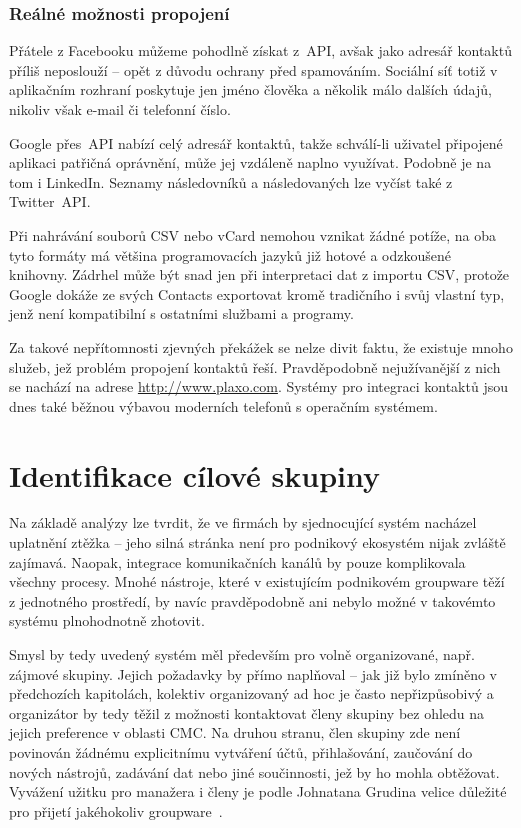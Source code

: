 \documentclass[12pt,oneside,final]{fithesis2}
\begin{document}
\subsubsection*{Reálné možnosti propojení}
Přátele z Facebooku můžeme pohodlně získat z~API, avšak jako adresář kontaktů příliš neposlouží -- opět z důvodu ochrany před spamováním. Sociální síť totiž v aplikačním rozhraní poskytuje jen jméno člověka a několik málo dalších údajů, nikoliv však e-mail či telefonní číslo.

Google přes~API nabízí celý adresář kontaktů, takže schválí-li uživatel připojené aplikaci patřičná oprávnění, může jej vzdáleně naplno využívat. Podobně je na tom i LinkedIn. Seznamy následovníků a následovaných lze vyčíst také z Twitter~API.

Při nahrávání souborů CSV nebo vCard nemohou vznikat žádné potíže, na oba tyto formáty má většina programovacích jazyků již hotové a odzkoušené knihovny. Zádrhel může být snad jen při interpretaci dat z importu CSV, protože Google dokáže ze svých Contacts exportovat kromě tradičního i svůj vlastní typ, jenž není kompatibilní s ostatními službami a programy.

Za takové nepřítomnosti zjevných překážek se nelze divit faktu, že existuje mnoho služeb, jež problém propojení kontaktů řeší. Pravděpodobně nejužívanější z nich se nachází na adrese \url{http://www.plaxo.com}. Systémy pro integraci kontaktů jsou dnes také běžnou výbavou moderních telefonů s operačním systémem.


\section{Identifikace cílové skupiny}\label{targetAudience}
Na základě analýzy lze tvrdit, že ve firmách by sjednocující systém nacházel uplatnění ztěžka -- jeho silná stránka není pro podnikový ekosystém nijak zvláště zajímavá. Naopak, integrace komunikačních kanálů by pouze komplikovala všechny procesy. Mnohé nástroje, které v existujícím podnikovém groupware těží z jednotného prostředí, by navíc pravděpodobně ani nebylo možné v takovémto systému plnohodnotně zhotovit.

Smysl by tedy uvedený systém měl především pro volně organizované, např. zájmové skupiny. Jejich požadavky by přímo naplňoval -- jak již bylo zmíněno v předchozích kapitolách, kolektiv organizovaný ad hoc je často nepřizpůsobivý a organizátor by tedy těžil z možnosti kontaktovat členy skupiny bez ohledu na jejich preference v oblasti CMC. Na druhou stranu, člen skupiny zde není povinován žádnému explicitnímu vytváření účtů, přihlašování, zaučování do nových nástrojů, zadávání dat nebo jiné součinnosti, jež by ho mohla obtěžovat. Vyvážení užitku pro manažera i členy je podle Johnatana Grudina velice důležité pro přijetí jakéhokoliv groupware~\cite{grudin1994groupware}.
\end{document}
